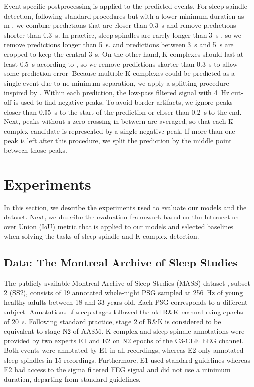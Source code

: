 \documentclass[conference]{IEEEtran}
\begin{document}
Event-specific postprocessing is applied to the predicted events. For sleep spindle detection, following standard procedures \cite{berry2012aasm} but with a lower minimum duration as in \cite{warby2014sleep}, we combine predictions that are closer than 0.3~s and remove predictions shorter than 0.3~s. In practice, sleep spindles are rarely longer than 3~s \cite{warby2014sleep}, so we remove predictions longer than 5~s, and predictions between 3~s and 5~s are cropped to keep the central 3~s. On the other hand, K-complexes should last at least 0.5~s according to \cite{berry2012aasm}, so we remove predictions shorter than 0.3~s to allow some prediction error. Because multiple K-complexes could be predicted as a single event due to no minimum separation, we apply a splitting procedure inspired by \cite{lajnef2017meet}. Within each prediction, the low-pass filtered signal with 4~Hz cut-off is used to find negative peaks. To avoid border artifacts, we ignore peaks closer than 0.05~s to the start of the prediction or closer than 0.2~s to the end. Next, peaks without a zero-crossing in between are averaged, so that each K-complex candidate is represented by a single negative peak. If more than one peak is left after this procedure, we split the prediction by the middle point between those peaks.



\section{Experiments}
In this section, we describe the experiments used to evaluate our models and the dataset. Next, we describe the evaluation framework based on the Intersection over Union (IoU) metric that is applied to our models and selected baselines when solving the tasks of sleep spindle and K-complex detection.

\subsection{Data: The Montreal Archive of Sleep Studies}
\label{sec:data_description}

The publicly available Montreal Archive of Sleep Studies (MASS) dataset \cite{o2014montreal}, subset 2 (SS2), consists of 19 annotated whole-night PSG sampled at 256~Hz of young healthy adults between 18 and 33 years old. Each PSG corresponds to a different subject. Annotations of sleep stages followed the old R\&K manual using epochs of 20~s. Following standard practice, stage 2 of R\&K is considered to be equivalent to stage N2 of AASM. K-complex and sleep spindle annotations were provided by two experts E1 and E2 on N2 epochs of the C3-CLE EEG channel. Both events were annotated by E1 in all recordings, whereas E2 only annotated sleep spindles in 15 recordings. Furthermore, E1 used standard guidelines whereas E2 had access to the sigma filtered EEG signal and did not use a minimum duration, departing from standard guidelines. 
\end{document}
